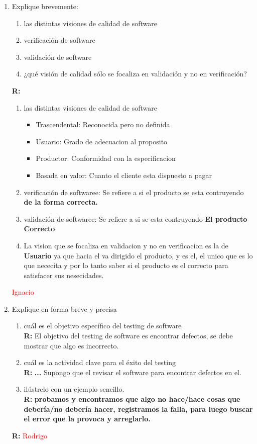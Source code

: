 \begin{enumerate}
	\item Explique brevemente:
		\begin{enumerate}
			\item las distintas visiones de calidad de software
			\item verificación de software
			\item validación de software
			\item ¿qué visión de calidad sólo se focaliza en validación y no en verificación?
		\end{enumerate}
	\textbf{R:}
                \begin{enumerate}
                        \item las distintas visiones de calidad de software
                 \begin{itemize}
                         \item Trascendental: Reconocida pero no definida
                         \item Usuario: Grado de adecuacion al proposito
                         \item Productor: Conformidad con la especificacion
                         \item Basada en valor: Cuanto el cliente esta dispuesto a pagar
                 \end{itemize}

                        \item verificación de softwaree: Se refiere a si el producto se esta contruyendo \textbf{de la forma correcta.}
                        \item validación de softwaree: Se refiere a si se esta contruyendo \textbf{El producto Correcto}
                        \item La vision que se focaliza en validacion y no en verificacion es la de \textbf{Usuario} ya que hacia el va dirigido el producto, y es el, el unico que es lo que nececita y por lo tanto saber si el producto es el correcto para satisfacer sus nesecidades.
                \end{enumerate}

	\textcolor{red}{Ignacio}

	\item Explique en forma breve y precisa
		\begin{enumerate}
			\item cuál es el objetivo específico del testing de software\\
	\textbf{R:}
El objetivo del testing de software es encontrar defectos, se debe mostrar que algo es incorrecto.
			\item cuál es la actividad clave para el éxito del testing\\
	\textbf{R:}
\textbf{...}
Supongo que el revisar el software para encontrar defectos en el.
			\item ilústrelo con un ejemplo sencillo.\\
	\textbf{R:}
\textbf{probamos y encontramos que algo no hace/hace cosas que debería/no debería hacer, registramos la
falla, para luego buscar el error que la provoca y arreglarlo. }
		\end{enumerate}
	\textbf{R:}
	\textcolor{red}{Rodrigo}


\end{enumerate}
